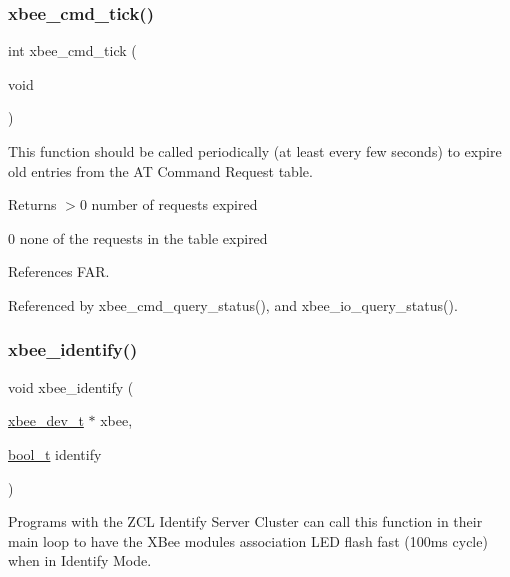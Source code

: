 \subsubsection{\texorpdfstring{xbee\+\_\+cmd\+\_\+tick()}{xbee\_cmd\_tick()}}
{\footnotesize\ttfamily int xbee\+\_\+cmd\+\_\+tick (\begin{DoxyParamCaption}\item[{void}]{ }\end{DoxyParamCaption})}



This function should be called periodically (at least every few seconds) to expire old entries from the AT Command Request table. 

\begin{DoxyReturn}{Returns}
$>$0 number of requests expired 

0 none of the requests in the table expired 
\end{DoxyReturn}


References F\+AR.



Referenced by xbee\+\_\+cmd\+\_\+query\+\_\+status(), and xbee\+\_\+io\+\_\+query\+\_\+status().

\mbox{\label{group__xbee__atcmd_ga42768d8f8aa841ed4f42396cff2815aa}} 
\subsubsection{\texorpdfstring{xbee\+\_\+identify()}{xbee\_identify()}}
{\footnotesize\ttfamily void xbee\+\_\+identify (\begin{DoxyParamCaption}\item[{\hyperlink{structxbee__dev__t}{xbee\+\_\+dev\+\_\+t} $\ast$}]{xbee,  }\item[{\hyperlink{group__hal__dos_ga04dd5074964518403bf944f2b240a5f8}{bool\+\_\+t}}]{identify }\end{DoxyParamCaption})}



Programs with the Z\+CL Identify Server Cluster can call this function in their main loop to have the X\+Bee module\textquotesingle{}s association L\+ED flash fast (100ms cycle) when in Identify Mode. 


